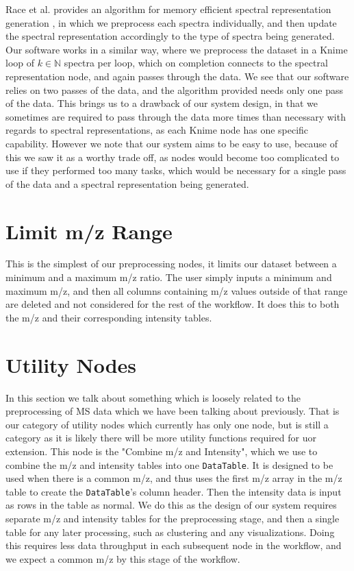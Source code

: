 \documentclass[11pt,openany]{book}
\begin{document}
Race et al. provides an algorithm for memory efficient spectral representation generation \cite{alan_race_phd_thesis}, in which we preprocess each spectra individually, and then update the spectral representation accordingly to the type of spectra being generated. Our software works in a similar way, where we preprocess the dataset in a Knime loop of $k \in \mathbb{N}$ spectra per loop, which on completion connects to the spectral representation node, and again passes through the data. We see that our software relies on two passes of the data, and the algorithm provided needs only one pass of the data. This brings us to a drawback of our system design, in that we sometimes are required to pass through the data more times than necessary with regards to spectral representations, as each Knime node has one specific capability. However we note that our system aims to be easy to use, because of this we saw it as a worthy trade off, as nodes would become too complicated to use if they performed too many tasks, which would be necessary for a single pass of the data and a spectral representation being generated.

\section{Limit m/z Range}
This is the simplest of our preprocessing nodes, it limits our dataset between a minimum and a maximum m/z ratio. The user simply inputs a minimum and maximum m/z, and then all columns containing m/z values outside of that range are deleted and not considered for the rest of the workflow. It does this to both the m/z and their corresponding intensity tables. 

\section{Utility Nodes}
In this section we talk about something which is loosely related to the preprocessing of MS data which we have been talking about previously. That is our category of utility nodes which currently has only one node, but is still a category as it is likely there will be more utility functions required for uor extension. This node is the "Combine m/z and Intensity", which we use to combine the m/z and intensity tables into one \texttt{DataTable}. It is designed to be used when there is a common m/z, and thus uses the first m/z array in the m/z table to create the \texttt{DataTable}'s column header. Then the intensity data is input as rows in the table as normal. We do this as the design of our system requires separate m/z and intensity tables for the preprocessing stage, and then a single table for any later processing, such as clustering and any visualizations. Doing this requires less data throughput in each subsequent node in the workflow, and we expect a common m/z by this stage of the workflow. 
\end{document}
